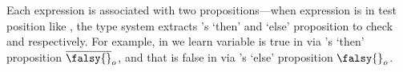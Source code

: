 Each expression is associated with two propositions---when expression
 is in test position like
,
the type system extracts 's `then' and `else' proposition to check
 and  respectively.
For example, in 
we learn variable {} is true in  via {}'s `then' proposition $\notprop{\falsy{}}{\makelocal{o}}$, and 
that {} is false in  via {}'s `else' proposition $\isprop{\falsy{}}{\makelocal{o}}$.

%

%





